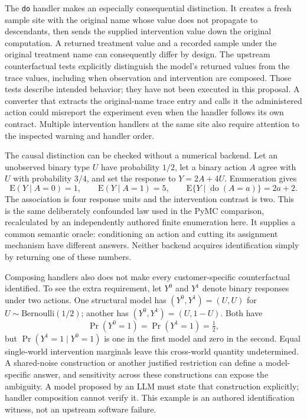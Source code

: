 The \texttt{do} handler makes an especially consequential distinction. It creates a fresh sample site with the original name whose value does not propagate to descendants, then sends the supplied intervention value down the original computation. A returned treatment value and a recorded sample under the original treatment name can consequently differ by design. The upstream counterfactual tests explicitly distinguish the model's returned values from the trace values, including when observation and intervention are composed. Those tests describe intended behavior; they have not been executed in this proposal. A converter that extracts the original-name trace entry and calls it the administered action could misreport the experiment even when the handler follows its own contract. Multiple intervention handlers at the same site also require attention to the inspected warning and handler order. \citep{exec23_numpyro_sources}

The causal distinction can be checked without a numerical backend. Let an unobserved binary type $U$ have probability $1/2$, let a binary action $A$ agree with $U$ with probability $3/4$, and set the response to $Y=2A+4U$. Enumeration gives
\begin{equation}
 \mathrm{E}(Y\mid A=0)=1,\qquad
 \mathrm{E}(Y\mid A=1)=5,\qquad
 \mathrm{E}\{Y\mid\operatorname{do}(A=a)\}=2a+2.
\end{equation}
The association is four response units and the intervention contrast is two. This is the same deliberately confounded law used in the PyMC comparison, recalculated by an independently authored finite enumeration here. It supplies a common semantic oracle: conditioning an action and cutting its assignment mechanism have different answers. Neither backend acquires identification simply by returning one of these numbers. \citep{exec23_pymc_reference,exec23_numpyro_reference}

Composing handlers also does not make every customer-specific counterfactual identified. To see the extra requirement, let $Y^0$ and $Y^1$ denote binary responses under two actions. One structural model has $(Y^0,Y^1)=(U,U)$ for $U\sim\mathrm{Bernoulli}(1/2)$; another has $(Y^0,Y^1)=(U,1-U)$. Both have
\begin{equation}
 \Pr(Y^0=1)=\Pr(Y^1=1)=\tfrac12,
\end{equation}
but $\Pr(Y^1=1\mid Y^0=1)$ is one in the first model and zero in the second. Equal single-world intervention marginals leave this cross-world quantity undetermined. A shared-noise construction or another justified restriction can define a model-specific answer, and sensitivity across these constructions can expose the ambiguity. A model proposed by an LLM must state that construction explicitly; handler composition cannot verify it. This example is an authored identification witness, not an upstream software failure. \citep{exec23_numpyro_reference}

